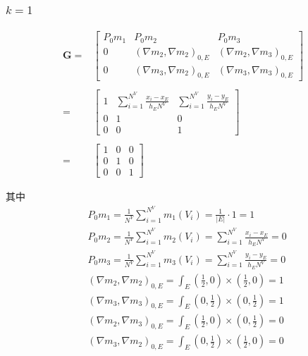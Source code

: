 \subsubsection{$k= 1$}

\begin{equation*}
\begin{aligned}
\mathbf G = &
\begin{bmatrix}
P_0 m_1 & P_0m_2 &  P_0 m_{3} \\
0 & (\nabla m_2, \nabla m_2)_{0,E} &  (\nabla m_2, \nabla m_{3})_{0,E}\\
0 & (\nabla m_{3}, \nabla m_2)_{0,E} &  (\nabla m_{3}, \nabla m_{3})_{0,E}
\end{bmatrix}\\
\\
= & \begin{bmatrix}
1 & \sum_{i=1}^{N^V} \frac{x_i - x_{E}}{h_EN^V} & \sum_{i=1}^{N^V} \frac{y_i - y_{E}}{h_EN^V}\\
0 & 1 & 0\\
0 & 0 & 1
\end{bmatrix}\\
\\
=& \begin{bmatrix}
1 & 0 & 0\\
0 & 1 & 0\\
0 & 0 & 1
\end{bmatrix}
\end{aligned}
\end{equation*}

其中\\
\begin{equation*}
\begin{aligned}
& P_0m_1 = \frac{1}{N^V}\sum_{i = 1}^{N^V}m_1(V_i) = \frac{1}{|E|}\cdot 1 = 1 \\
& P_0m_2 = \frac{1}{N^V}\sum_{i = 1}^{N^V}m_2(V_i) = \sum_{i=1}^{N^V} \frac{x_i - x_{E}}{h_EN^V} = 0 \\
& P_0m_3 = \frac{1}{N^V}\sum_{i = 1}^{N^V}m_3(V_i) = \sum_{i=1}^{N^V} \frac{y_i - y_{E}}{h_EN^V} = 0 \\
& (\nabla m_2,\nabla m_2)_{0,E} = \int_{E} (\frac{1}{2},0)\times(\frac{1}{2},0) = 1 \\
& (\nabla m_3,\nabla m_3)_{0,E} = \int_{E} (0, \frac{1}{2})\times(0, \frac{1}{2}) = 1 \\
& (\nabla m_2,\nabla m_3)_{0,E} = \int_{E} (\frac{1}{2},0)\times(0,\frac{1}{2}) = 0 \\
& (\nabla m_3,\nabla m_2)_{0,E} = \int_{E} (0,\frac{1}{2})\times(\frac{1}{2},0) = 0 \\
\end{aligned}
\end{equation*}

